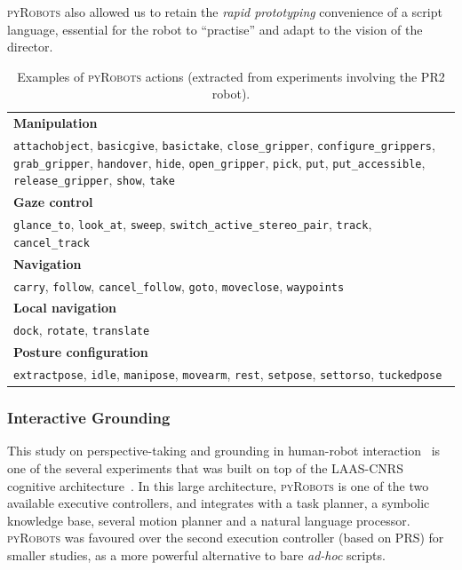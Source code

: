 \documentclass[a4paper, 10pt, conference]{ieeeconf}      %
\newcommand{\pyRobots}{\textsc{pyRobots}}
\begin{document}
\pyRobots{} also allowed us to retain the \emph{rapid prototyping} convenience of a
script language, essential for the robot to ``practise'' and adapt to the
vision of the director.

\begin{table}[ht!]
\begin{center}
\begin{tabular}{p{}}
    \toprule
    {\bf Manipulation} \\
     {\tt attachobject}, {\tt basicgive}, {\tt basictake}, {\tt close\_gripper}, {\tt configure\_grippers}, {\tt grab\_gripper}, {\tt handover}, {\tt hide}, {\tt open\_gripper}, {\tt pick}, {\tt put}, {\tt put\_accessible}, {\tt release\_gripper}, {\tt show}, {\tt take} \\
     \midrule
    {\bf Gaze control} \\
     {\tt glance\_to}, {\tt look\_at}, {\tt sweep}, {\tt switch\_active\_stereo\_pair}, {\tt track}, {\tt cancel\_track} \\
     \midrule
    {\bf Navigation} \\
     {\tt carry}, {\tt follow}, {\tt cancel\_follow}, {\tt goto}, {\tt moveclose}, {\tt waypoints} \\
     \midrule
    {\bf Local navigation} \\
     {\tt dock}, {\tt rotate}, {\tt translate} \\
     \midrule
    {\bf Posture configuration} \\
     {\tt extractpose}, {\tt idle}, {\tt manipose}, {\tt movearm}, {\tt rest}, {\tt setpose}, {\tt settorso}, {\tt tuckedpose} \\
     \bottomrule
\end{tabular}
\end{center}
\caption{Examples of \pyRobots{} actions (extracted from experiments involving
the PR2 robot).}

\label{pyrobots_actions}
\end{table}

\subsubsection{Interactive Grounding} This study on perspective-taking and grounding
in human-robot interaction~\cite{lemaignan2013talking} is one of the several
experiments that was built on top of the LAAS-CNRS cognitive
architecture~\cite{lemaignan2014human}. In this large architecture, \pyRobots{}
is one of the two available executive controllers, and integrates with a task
planner, a symbolic knowledge base, several motion planner and a natural
language processor. \pyRobots{} was favoured over the second execution
controller (based on PRS) for smaller studies, as a more powerful alternative to
bare \textit{ad-hoc} scripts.
\end{document}
